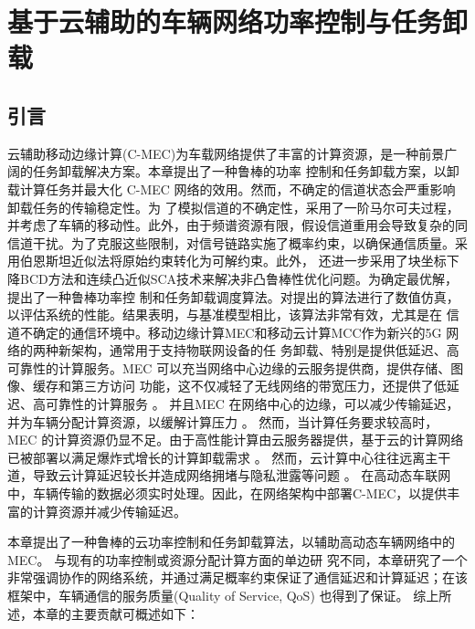 \chapter{基于云辅助的车辆网络功率控制与任务卸载} \label{chap:table 第三章}  %

\section{引言}\label{section3-1}
云辅助移动边缘计算(C-MEC)为车载网络提供了丰富的计算资源，是一种前景广阔的任务卸载解决方案。本章提出了一种鲁棒的功率
控制和任务卸载方案，以卸载计算任务并最大化 C-MEC 网络的效用。然而，不确定的信道状态会严重影响卸载任务的传输稳定性。为
了模拟信道的不确定性，采用了一阶马尔可夫过程，并考虑了车辆的移动性。此外，由于频谱资源有限，假设信道重用会导致复杂的同
信道干扰。为了克服这些限制，对信号链路实施了概率约束，以确保通信质量。采用伯恩斯坦近似法将原始约束转化为可解约束。此外，
还进一步采用了块坐标下降BCD方法和连续凸近似SCA技术来解决非凸鲁棒性优化问题。为确定最优解，提出了一种鲁棒功率控
制和任务卸载调度算法。对提出的算法进行了数值仿真，以评估系统的性能。结果表明，与基准模型相比，该算法非常有效，尤其是在
信道不确定的通信环境中。移动边缘计算MEC和移动云计算MCC作为新兴的5G 网络的两种新架构，通常用于支持物联网设备的任
务卸载、特别是提供低延迟、高可靠性的计算服务。MEC 可以充当网络中心边缘的云服务提供商，提供存储、图像、缓存和第三方访问
功能，这不仅减轻了无线网络的带宽压力，还提供了低延迟、高可靠性的计算服务 \cite{基于车辆边缘计算的任务卸载策略研究}。
并且MEC 在网络中心的边缘，可以减少传输延迟，并为车辆分配计算资源，以缓解计算压力 \cite{CCO}。 然而，当计算任务要求较高时，
MEC 的计算资源仍显不足。由于高性能计算由云服务器提供，基于云的计算网络已被部署以满足爆炸式增长的计算卸载需求 \supercite{SurveyMEC2017,SurveyMEC2018,DistributedTask2024}。  %
然而，云计算中心往往远离主干道，导致云计算延迟较长并造成网络拥堵与隐私泄露等问题 \supercite{Qian2023, 曹宇慧车载边缘计算环境下任务协同卸载方法研究,云计算隐私10418975}。
在高动态车联网中，车辆传输的数据必须实时处理。因此，在网络架构中部署C-MEC，以提供丰富的计算资源并减少传输延迟。

本章提出了一种鲁棒的云功率控制和任务卸载算法，以辅助高动态车辆网络中的 MEC。 与现有的功率控制或资源分配计算方面的单边研
究不同，本章研究了一个非常强调协作的网络系统，并通过满足概率约束保证了通信延迟和计算延迟；在该框架中，车辆通信的服务质量(Quality of Service, QoS)
也得到了保证。 综上所述，本章的主要贡献可概述如下：

